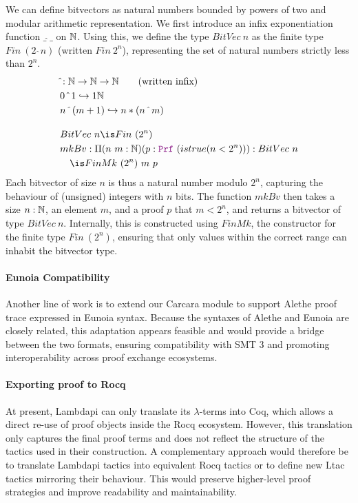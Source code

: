 \begin{definition}[Bitvector]\label{def:bv-def}
We can define bitvectors as natural numbers bounded by powers of two and modular arithmetic representation.
We first introduce an infix exponentiation function $\_\,\hat{}\,\_$ on $\mathbb{N}$.
Using this, we define the type $BitVec~n$ as the finite type $Fin~(2~\hat~n)$ (written $Fin~2^n$), representing the set of natural numbers strictly less than $2^n$.
\begin{align*}
& \hat{}: \N \ra \N \ra \N \qquad \text{(written inﬁx)}\\
& 0 ~\hat{}~ 1 \re 1 \N\\
& n ~\hat{}~ (m + 1) \re n * (n ~\hat{}~ m)\\[1em]
&BitVec~n \is Fin~(2^n) \\
& mkBv: \Pi(n~m: \N)(p: \prf~(istrue(n < 2^n))): BitVec~n\\
&\quad\is FinMk~(2^n)~m~p
\end{align*}
Each bitvector of size $n$ is thus a natural number modulo $2^n$, capturing the behaviour of (unsigned) integers with $n$ bits.
The function $mkBv$ then takes a size $n: \mathbb{N}$, an element $m$, and a proof $p$ that $m < 2^n$, and returns a bitvector of type $BitVec~n$.
Internally, this is constructed using $FinMk$, the constructor for the finite type $Fin~(2^n)$, ensuring that only values within the correct range can inhabit the bitvector type.
\end{definition}


\paragraph{Eunoia Compatibility} 
Another line of work is to extend our Carcara module to support Alethe proof trace expressed in Eunoia syntax. 
Because the syntaxes of Alethe and Eunoia are closely related, this adaptation appears feasible and would provide a bridge between the two formats, ensuring compatibility with SMT 3 and promoting interoperability across proof exchange ecosystems.


\paragraph{Exporting proof to Rocq}
At present, Lambdapi can only translate its $\lambda$-terms into Coq, which allows a direct re-use of proof objects inside the Rocq ecosystem.
However, this translation only captures the final proof terms and does not reflect the structure of the tactics used in their construction. 
A complementary approach would therefore be to translate Lambdapi tactics into equivalent Rocq tactics or to define new Ltac tactics mirroring their behaviour. 
This would preserve higher-level proof strategies and improve readability and maintainability. 


